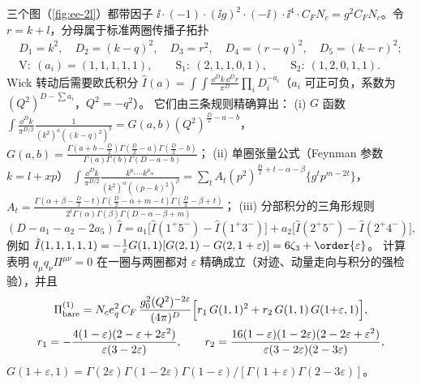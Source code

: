 三个图（\cref{fig:ee-2l}）都带因子 $\ii\cdot(-1)\cdot(\ii g)^2\cdot(-\ii)\cdot\ii^4\cdot C_FN_c=g^2C_FN_c$。令 $r=k+l$，分母属于标准两圈传播子拓扑
\begin{equation}\label{eq:ee-topo}
\begin{gathered}
D_1=k^2,\quad D_2=(k-q)^2,\quad D_3=r^2,\quad D_4=(r-q)^2,\quad D_5=(k-r)^2;\\
\text{V}:\ (a_i)=(1,1,1,1,1),\qquad \text{S}_1:\ (2,1,1,0,1),\qquad \text{S}_2:\ (1,2,0,1,1).
\end{gathered}
\end{equation}
Wick 转动后需要欧氏积分 $\hat I(a)=\int\!\!\int\frac{\dd^Dk\,\dd^Dr}{\pi^D}\prod_iD_i^{-a_i}$（$a_i$ 可正可负，系数为 $(Q^2)^{D-\sum a_i}$，$Q^2=-q^2$）。
它们由三条规则精确算出：
(i) $G$ 函数 $\int\frac{\dd^Dk}{\pi^{D/2}}\frac{1}{(k^2)^a((k-q)^2)^b}=G(a,b)(Q^2)^{\frac D2-a-b}$，
$G(a,b)=\frac{\Gamma(a+b-\frac D2)\Gamma(\frac D2-a)\Gamma(\frac D2-b)}{\Gamma(a)\Gamma(b)\Gamma(D-a-b)}$；
(ii) 单圈张量公式（Feynman 参数 $k=l+xp$）
$\int\frac{\dd^Dk}{\pi^{D/2}}\frac{k^{\mu_1}\cdots k^{\mu_m}}{(k^2)^\alpha((p-k)^2)^\beta}=\sum_tA_t(p^2)^{\frac D2+t-\alpha-\beta}\{g^tp^{m-2t}\}$，
$A_t=\frac{\Gamma(\alpha+\beta-\frac D2-t)\Gamma(\frac D2-\alpha+m-t)\Gamma(\frac D2-\beta+t)}{2^t\Gamma(\alpha)\Gamma(\beta)\Gamma(D-\alpha-\beta+m)}$；
(iii) 分部积分的三角形规则\cite{ChetyrkinTkachov1981,Tkachov1981}
\begin{equation}\label{eq:ee-ibp}
(D-a_1-a_2-2a_5)\,\hat I=a_1\big[\hat I(1^+5^-)-\hat I(1^+3^-)\big]+a_2\big[\hat I(2^+5^-)-\hat I(2^+4^-)\big],
\end{equation}
例如 $\hat I(1,1,1,1,1)=-\frac1\varepsilon G(1,1)[G(2,1)-G(2,1+\varepsilon)]=6\zeta_3+\order{\varepsilon}$。
计算表明 $q_\mu q_\nu\Pi^{\mu\nu}=0$ 在一圈与两圈都对 $\varepsilon$ 精确成立（对迹、动量走向与积分的强检验），并且
\begin{equation}\label{eq:ee-Pi2bare}
\begin{gathered}
\Pi^{(1)}_{\rm bare}=N_ce_q^2\,C_F\,\frac{g_0^2(Q^2)^{-2\varepsilon}}{(4\pi)^D}\Big[r_1\,G(1,1)^2+r_2\,G(1,1)\,G(1{+}\varepsilon,1)\Big],\\
r_1=-\frac{4(1-\varepsilon)(2-\varepsilon+2\varepsilon^2)}{\varepsilon(3-2\varepsilon)},\qquad
r_2=\frac{16(1-\varepsilon)(1-2\varepsilon)(2-2\varepsilon+\varepsilon^2)}{\varepsilon(3-2\varepsilon)(2-3\varepsilon)},
\end{gathered}
\end{equation}
$G(1{+}\varepsilon,1)=\Gamma(2\varepsilon)\Gamma(1-2\varepsilon)\Gamma(1-\varepsilon)/[\Gamma(1+\varepsilon)\Gamma(2-3\varepsilon)]$。

